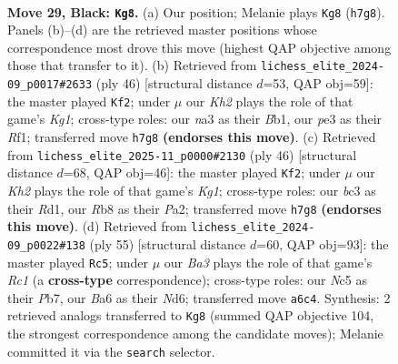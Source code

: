 \documentclass[11pt]{article}
\begin{document}
\clearpage

\begin{figure}[p]\centering
\begin{subfigure}{0.46\textwidth}\centering
\resizebox{\linewidth}{!}{%
\newchessgame
\chessboard[
  setfen={1r3r2/p4p1k/bpB1p1pp/2n5/2P5/N1B1P2P/PR3PP1/3R1K2 b - - 4 29},
  showmover=false,
  pgfstyle=straightmove, color=movearrow, markmove={h7-g8}
]}
\caption{}
\end{subfigure}\hfill
\begin{subfigure}{0.46\textwidth}\centering
\resizebox{\linewidth}{!}{%
\newchessgame
\chessboard[
  setfen={5rk1/p2r2pp/1pn5/1Np2b2/P1P5/3P1P2/6PP/RB3RK1 w - - 0 24},
  showmover=false,
  pgfstyle=straightmove, color=movearrow, markmove={g1-f2}
]}
\caption{}
\end{subfigure}
\\[4pt]
\begin{subfigure}{0.46\textwidth}\centering
\resizebox{\linewidth}{!}{%
\newchessgame
\chessboard[
  setfen={3r1k2/1br2ppp/2p1p3/ppP5/3P1P2/3R2P1/PP4BP/3R2K1 w - - 1 24},
  showmover=false,
  pgfstyle=straightmove, color=movearrow, markmove={g1-f2}
]}
\caption{}
\end{subfigure}\hfill
\begin{subfigure}{0.46\textwidth}\centering
\resizebox{\linewidth}{!}{%
\newchessgame
\chessboard[
  setfen={2r4r/pp3kpp/b2n1p2/3Pp3/P1P5/3B2P1/3N1PP1/R1R3K1 b - - 4 28},
  showmover=false,
  pgfstyle=straightmove, color=movearrow, markmove={c8-c5}
]}
\caption{}
\end{subfigure}
\caption{\textbf{Move 29, Black: \texttt{Kg8}.} (a) Our position; Melanie plays \texttt{Kg8} (\texttt{h7g8}). Panels (b)--(d) are the retrieved master positions whose correspondence most drove this move (highest QAP objective among those that transfer to it). (b) Retrieved from \texttt{lichess\_elite\_2024-09\_p0017\#2633} (ply 46) [structural distance $d$=53, QAP obj=59]: the master played \texttt{Kf2}; under $\mu$ our \emph{Kh2} plays the role of that game's \emph{Kg1}; cross-type roles: our \emph{n}a3 as their \emph{B}b1, our \emph{p}e3 as their \emph{R}f1; transferred move \texttt{h7g8} \textbf{(endorses this move)}. (c) Retrieved from \texttt{lichess\_elite\_2025-11\_p0000\#2130} (ply 46) [structural distance $d$=68, QAP obj=46]: the master played \texttt{Kf2}; under $\mu$ our \emph{Kh2} plays the role of that game's \emph{Kg1}; cross-type roles: our \emph{b}c3 as their \emph{R}d1, our \emph{R}b8 as their \emph{P}a2; transferred move \texttt{h7g8} \textbf{(endorses this move)}. (d) Retrieved from \texttt{lichess\_elite\_2024-09\_p0022\#138} (ply 55) [structural distance $d$=60, QAP obj=93]: the master played \texttt{Rc5}; under $\mu$ our \emph{Ba3} plays the role of that game's \emph{Rc1} (a \textbf{cross-type} correspondence); cross-type roles: our \emph{N}c5 as their \emph{P}b7, our \emph{B}a6 as their \emph{N}d6; transferred move \texttt{a6c4}. Synthesis: 2 retrieved analogs transferred to \texttt{Kg8} (summed QAP objective 104, the strongest correspondence among the candidate moves); Melanie committed it via the \texttt{search} selector.}
\label{fig:thought-m57}
\end{figure}
\end{document}
